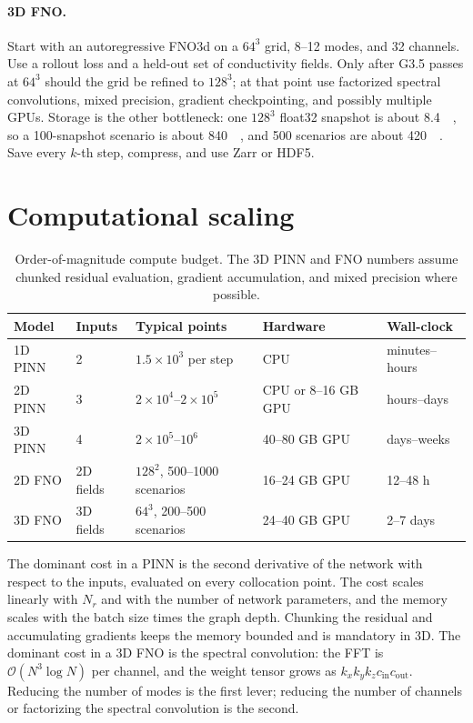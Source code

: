 \documentclass[11pt]{article}
\newcommand{\tabhead}[1]{\textbf{#1}}
\begin{document}
\paragraph{3D FNO.}
Start with an autoregressive FNO3d on a $64^3$ grid, 8--12 modes, and 32
channels.  Use a rollout loss and a held-out set of conductivity fields.  Only
after G3.5 passes at $64^3$ should the grid be refined to $128^3$; at that
point use factorized spectral convolutions, mixed precision, gradient
checkpointing, and possibly multiple GPUs.  Storage is the other bottleneck:
one $128^3$ float32 snapshot is about \SI{8.4}{\mega\byte}, so a 100-snapshot
scenario is about \SI{840}{\mega\byte}, and 500 scenarios are about
\SI{420}{\giga\byte}.  Save every $k$-th step, compress, and use Zarr or HDF5.

\section{Computational scaling}
\label{sec:compute}

\begin{table}[htbp]
\centering
\small
\begin{tabularx}{\textwidth}{@{}lYYYY@{}}
\toprule
\tabhead{Model} & \tabhead{Inputs} & \tabhead{Typical points} &
\tabhead{Hardware} & \tabhead{Wall-clock}\\
\midrule
1D PINN & 2 & $1.5\times10^3$ per step & CPU & minutes--hours\\
2D PINN & 3 & $2\times10^4$--$2\times10^5$ & CPU or 8--16 GB GPU & hours--days\\
3D PINN & 4 & $2\times10^5$--$10^6$ & 40--80 GB GPU & days--weeks\\
2D FNO & 2D fields & $128^2$, 500--1000 scenarios & 16--24 GB GPU & 12--48 h\\
3D FNO & 3D fields & $64^3$, 200--500 scenarios & 24--40 GB GPU & 2--7 days\\
\bottomrule
\end{tabularx}
\caption{Order-of-magnitude compute budget.  The 3D PINN and FNO numbers assume
chunked residual evaluation, gradient accumulation, and mixed precision where
possible.}
\label{tab:compute}
\end{table}

The dominant cost in a PINN is the second derivative of the network with
respect to the inputs, evaluated on every collocation point.  The cost scales
linearly with $N_r$ and with the number of network parameters, and the memory
scales with the batch size times the graph depth.  Chunking the residual and
accumulating gradients keeps the memory bounded and is mandatory in 3D.  The
dominant cost in a 3D FNO is the spectral convolution: the FFT is
$\mathcal{O}(N^3\log N)$ per channel, and the weight tensor grows as
$k_xk_yk_zc_{\mathrm{in}}c_{\mathrm{out}}$.  Reducing the number of modes is the
first lever; reducing the number of channels or factorizing the spectral
convolution is the second.
\end{document}

